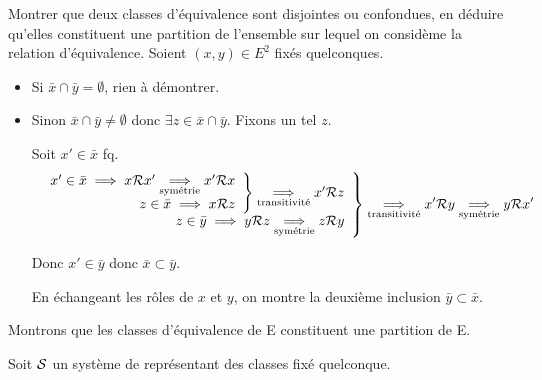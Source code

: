 \documentclass{article}
\renewenvironment{question_kholle}[2][ ]
{
	\subsection{\texorpdfstring{#2}{}}
	\notblank{#1}
	{
		\noindent #1
		\bigbreak
	}
	{}
	\begin{proof}
}
{
	\end{proof}
}
\begin{document}
\begin{question_kholle}
	[Soit \Rel une relation d'équivalence sur $E$ et $x\in E$. \\
		La classe de $x$, notée $\bar{x}$, est l'ensemble des éléments de $E$ en relation avec x :
		$$
			\bar{x} = \left\{ y \in E \;|\; x \Rel y \right\}
		$$
	]
	{Montrer que deux classes d’équivalence sont disjointes ou confondues, en déduire qu’elles constituent une partition de l’ensemble sur lequel on considème la relation d’équivalence.}
	Soient $(x, y) \in E^2$ fixés quelconques.
	\begin{itemize}[label=\textemdash]
		\item Si $\bar{x} \cap \bar{y} = \emptyset$, rien à démontrer.
		\item Sinon $\bar{x} \cap \bar{y} \neq \emptyset$ donc $\exists z \in \bar{x} \cap \bar{y}$. Fixons un tel $z$.

		      Soit $x' \in \bar{x}$ fq.
		      \begin{equation*}
			      \left.
			      \begin{array}{r}
				      \left. \begin{array}{r}
					             x' \in \bar{x} \implies x \mathcal R x' \underset{\text{symétrie}}{\implies} x' \mathcal R x \\
					             z \in \bar{x} \implies x \mathcal R z
				             \end{array}
				      \right\} \underset{\text{transitivité}}{\implies} x' \mathcal R z \\
				      z \in \bar{y} \implies y \mathcal R z \underset{\text{symétrie}}{\implies} z \mathcal R y
			      \end{array}
			      \right\} \underset{\text{transitivité}}{\implies} x' \mathcal R y
			      \underset{\text{symétrie}}{\implies} y \mathcal R x'
		      \end{equation*}

		      Donc $x' \in \bar{y}$ donc $\bar{x} \subset \bar{y}$.

		      En échangeant les rôles de $x$ et $y$, on montre la deuxième inclusion $\bar{y} \subset \bar{x}$.
	\end{itemize}
	\bigbreak

	Montrons que les classes d'équivalence de E constituent une partition de E.

	Soit $\mathcal S$ un système de représentant des classes fixé quelconque.


\end{question_kholle}
\end{document}
